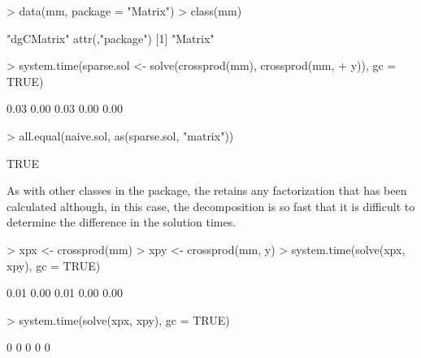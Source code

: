 \documentclass{article}
\begin{document}
\begin{Schunk}
\begin{Sinput}
> data(mm, package = "Matrix")
> class(mm)
\end{Sinput}
\begin{Soutput}
[1] "dgCMatrix"
attr(,"package")
[1] "Matrix"
\end{Soutput}
\begin{Sinput}
> system.time(sparse.sol <- solve(crossprod(mm), crossprod(mm, 
+     y)), gc = TRUE)
\end{Sinput}
\begin{Soutput}
[1] 0.03 0.00 0.03 0.00 0.00
\end{Soutput}
\begin{Sinput}
> all.equal(naive.sol, as(sparse.sol, "matrix"))
\end{Sinput}
\begin{Soutput}
[1] TRUE
\end{Soutput}
\end{Schunk}

As with other classes in the  package, the
 retains any factorization that has been calculated
although, in this case, the decomposition is so fast that it is
difficult to determine the difference in the solution times.

\begin{Schunk}
\begin{Sinput}
> xpx <- crossprod(mm)
> xpy <- crossprod(mm, y)
> system.time(solve(xpx, xpy), gc = TRUE)
\end{Sinput}
\begin{Soutput}
[1] 0.01 0.00 0.01 0.00 0.00
\end{Soutput}
\begin{Sinput}
> system.time(solve(xpx, xpy), gc = TRUE)
\end{Sinput}
\begin{Soutput}
[1] 0 0 0 0 0
\end{Soutput}
\end{Schunk}


\end{document}
